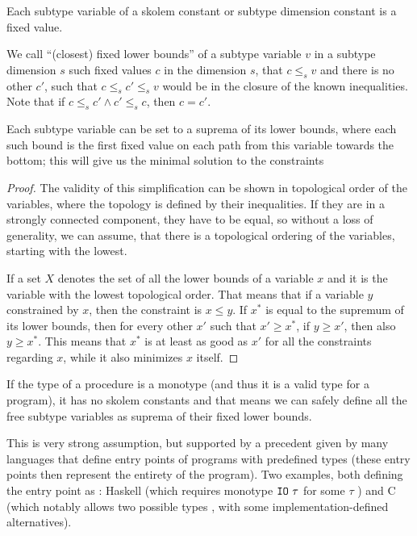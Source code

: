 \begin{defn}
    Each subtype variable of a skolem constant or subtype dimension constant is a fixed value.
\end{defn}

\begin{defn}
    We call ``(closest) fixed lower bounds'' of a subtype variable $v$ in a subtype dimension $s$ such fixed values $c$ in the dimension $s$, that $c \leq_s v$ and there is no other $c'$, such that $c \leq_s c' \leq_s v$ would be in the closure of the known inequalities. Note that if $c \leq_s c' \land c' \leq_s c$, then $c = c'$.
\end{defn}

\begin{lemma}Each subtype variable can be set to a suprema of its lower bounds, where each such bound is the first fixed value on each path from this variable towards the bottom; this will give us the minimal solution to the constraints
    \label{suprema_subtyping}

    \begin{proof}
        The validity of this simplification can be shown in topological order of the variables, where the topology is defined by their inequalities. If they are in a strongly connected component, they have to be equal, so without a loss of generality, we can assume, that there is a topological ordering of the variables, starting with the lowest.

        If a set $X$ denotes the set of all the lower bounds of a variable $x$ and it is the variable with the lowest topological order. That means that if a variable $y$ constrained by $x$, then the constraint is $x \leq y$. If $x^\ast$ is equal to the supremum of its lower bounds, then for every other $x'$ such that $x' \geq x^\ast$, if $y \geq x'$, then also $y \geq x^\ast$. This means that $x^\ast$ is at least as good as $x'$ for all the constraints regarding $x$, while it also minimizes $x$ itself.
    \end{proof}
\end{lemma}

\begin{cor}
    If the type of a procedure is a monotype (and thus it is a valid type for a program), it has no skolem constants and that means we can safely define all the free subtype variables as suprema of their fixed lower bounds.

    This is very strong assumption, but supported by a precedent given by many languages that define entry points of programs with predefined types (these entry points then represent the entirety of the program). Two examples, both defining the entry point as : Haskell (which requires monotype $\mathtt{IO}\ \tau$ for some $\tau$ \cite{haskell2010}) and C (which notably allows two possible types \cite{cstandard2018}, with some implementation-defined alternatives).
\end{cor}


